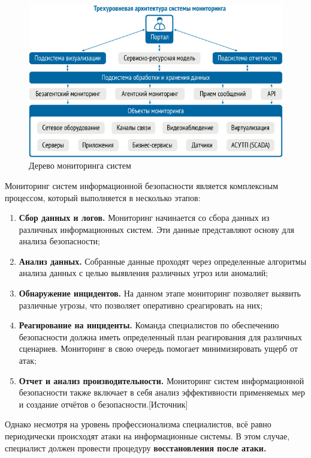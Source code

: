     \begin{figure}[H]
        \centering
        \includegraphics[width = 14cm]{img/monitoring.png}
        \caption{Дерево мониторинга систем}        
    \end{figure}

    \newpage
    Мониторинг систем информационной безопасности является комплексным процессом, который выполняется в несколько этапов:

    \begin{enumerate}
        \item \textbf{Сбор данных и логов.}
            Мониторинг начинается со сбора данных из различных информационных систем. Эти данные представляют основу для анализа безопасности;
        \item \textbf{Анализ данных.}
            Собранные данные проходят через определенные алгоритмы анализа данных с целью выявления различных угроз или аномалий;
        \item \textbf{Обнаружение инцидентов.}
            На данном этапе мониторинг позволяет выявить различные угрозы, что позволяет оперативно среагировать на них;
        \item \textbf{Реагирование на инциденты.}
            Команда специалистов по обеспечению безопасности должна иметь определенный план реагирования для различных сценариев. Мониторинг
            в свою очередь помогает минимизировать ущерб от атак;
        \item \textbf{Отчет и анализ производительности.}
            Мониторинг систем информационной безопасности также включает в себя анализ эффективности применяемых мер и создание отчётов о безопасности.[Источник]
    \end{enumerate}

    Однако несмотря на уровень профессионализма специалистов, всё равно периодически происходят атаки на информационные системы. В этом случае, специалист 
    должен провести процедуру \textbf{восстановления после атаки.} 


